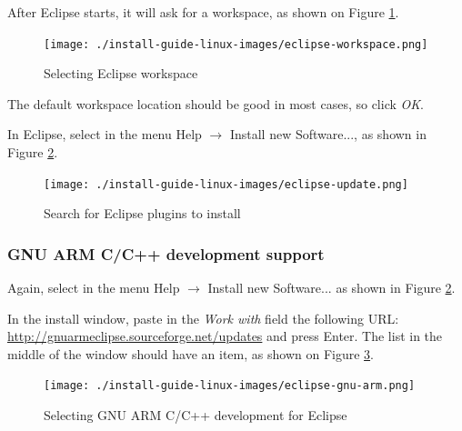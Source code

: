 \documentclass[a4paper, 10pt]{article}
\begin{document}
After Eclipse starts, it will ask for a workspace, as shown on Figure \ref{fig:eclipse-workspace}.

    \begin{figure}[H]
    \centering
        \texttt{[image: ./install-guide-linux-images/eclipse-workspace.png]}
        \caption{Selecting Eclipse workspace}
        \label{fig:eclipse-workspace}
    \end{figure}

The default workspace location should be good in most cases, so click \emph{OK}.

In Eclipse, select in the menu Help $\rightarrow$ Install new Software..., as shown in
Figure \ref{fig:eclipse-update}.

    \begin{figure}[H]
    \centering
        \texttt{[image: ./install-guide-linux-images/eclipse-update.png]}
        \caption{Search for Eclipse plugins to install}
        \label{fig:eclipse-update}
    \end{figure}



%

\subsubsection{GNU ARM C/C++ development support}

Again, select in the menu Help $\rightarrow$ Install new Software... as shown in
Figure \ref{fig:eclipse-update}.

In the install window, paste in the \emph{Work with} field
the following URL:
\url{http://gnuarmeclipse.sourceforge.net/updates} and press Enter.
The list in the middle of the window should have an item, as shown on
Figure \ref{fig:eclipse-gnu-arm}.

    \begin{figure}[H]
    \centering
        \texttt{[image: ./install-guide-linux-images/eclipse-gnu-arm.png]}
        \caption{Selecting GNU ARM C/C++ development for Eclipse}
        \label{fig:eclipse-gnu-arm}
    \end{figure}
\end{document}

